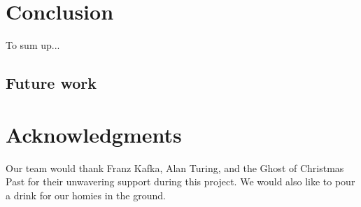 \documentclass{aiaa-tc}%
\begin{document}
\section{Conclusion}
\label{Conclusion}
To sum up...

\subsection{Future work}

\section{Acknowledgments}
Our team would thank Franz Kafka, Alan Turing, and the Ghost of
Christmas Past for their unwavering support during this project. We
would also like to pour a drink for our homies in the ground.


% 

% 
\end{document}
